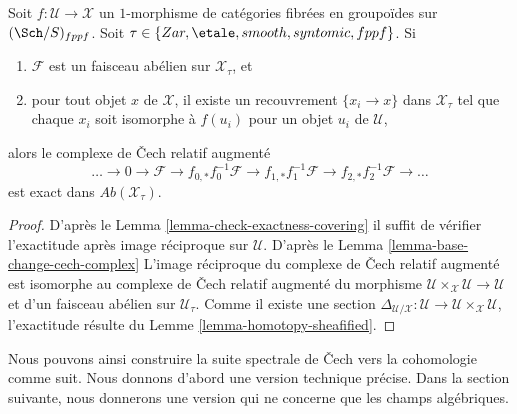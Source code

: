 \begin{proposition}
\label{proposition-exactness-cech-complex}
Soit $f : \mathcal{U} \to \mathcal{X}$ un $1$-morphisme de catégories fibrées
en groupoïdes sur $(\Sch/S)_{fppf}$. Soit
$\tau \in \{Zar, \etale, smooth, syntomic, fppf\}$.
Si
\begin{enumerate}
\item $\mathcal{F}$ est un faisceau abélien sur $\mathcal{X}_\tau$, et
\item pour tout objet $x$ de $\mathcal{X}$, il existe un recouvrement
$\{x_i \to x\}$ dans $\mathcal{X}_\tau$ tel que chaque $x_i$ soit isomorphe
à $f(u_i)$ pour un objet $u_i$ de $\mathcal{U}$,
\end{enumerate}
alors le complexe de {\v C}ech relatif augmenté
$$
\ldots \to 0 \to
\mathcal{F} \to
f_{0, *}f_0^{-1}\mathcal{F} \to
f_{1, *}f_1^{-1}\mathcal{F} \to
f_{2, *}f_2^{-1}\mathcal{F} \to \ldots
$$
est exact dans $\textit{Ab}(\mathcal{X}_\tau)$.
\end{proposition}

\begin{proof}
D'après le
Lemma \ref{lemma-check-exactness-covering}
il suffit de vérifier l'exactitude après image réciproque sur $\mathcal{U}$.
D'après le
Lemma \ref{lemma-base-change-cech-complex}
L'image réciproque du complexe de {\v C}ech relatif augmenté est isomorphe
au complexe de {\v C}ech relatif augmenté du morphisme
$\mathcal{U} \times_\mathcal{X} \mathcal{U} \to \mathcal{U}$
et d'un faisceau abélien sur $\mathcal{U}_\tau$. Comme il existe une section
$\Delta_{\mathcal{U}/\mathcal{X}} : \mathcal{U} \to
\mathcal{U} \times_\mathcal{X} \mathcal{U}$, l'exactitude résulte du
Lemme \ref{lemma-homotopy-sheafified}.
\end{proof}

\noindent
Nous pouvons ainsi construire la suite spectrale de {\v C}ech vers la cohomologie
comme suit. Nous donnons d'abord une version technique précise. Dans la section suivante,
nous donnerons une version qui ne concerne que les champs algébriques.

